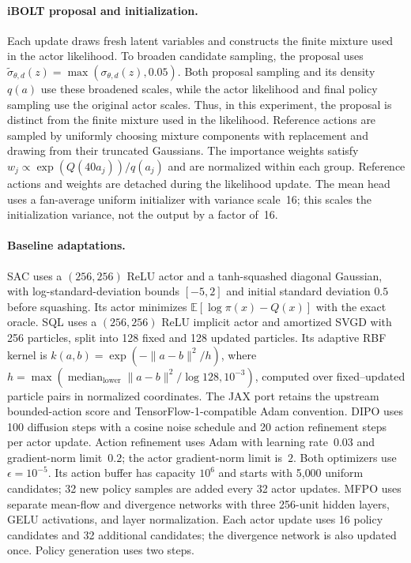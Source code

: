 \paragraph{iBOLT proposal and initialization.}
Each update draws fresh latent variables and constructs the finite mixture
used in the actor likelihood. To broaden candidate sampling, the proposal
uses $\widetilde{\sigma}_{\theta,d}(z)=\max(\sigma_{\theta,d}(z),0.05)$.
Both proposal sampling and its density $q(a)$ use these broadened scales,
while the actor likelihood and final policy sampling use the original
actor scales. Thus, in this experiment, the proposal is distinct from the
finite mixture used in the likelihood. Reference actions are sampled by
uniformly choosing mixture components with replacement and drawing from
their truncated Gaussians. The importance weights satisfy
$w_j\propto\exp(Q(40a_j))/q(a_j)$ and are normalized within each group.
Reference actions and weights are detached during the likelihood update.
The mean head uses a fan-average uniform initializer with variance scale~16;
this scales the initialization variance, not the output by a factor of~16.

\paragraph{Baseline adaptations.}
SAC uses a $(256,256)$ ReLU actor and a tanh-squashed diagonal Gaussian,
with log-standard-deviation bounds $[-5,2]$ and initial standard deviation
$0.5$ before squashing. Its actor minimizes
$\mathbb{E}[\log\pi(x)-Q(x)]$ with the exact oracle.
SQL uses a $(256,256)$ ReLU implicit actor and amortized SVGD with
256 particles, split into 128 fixed and 128 updated particles.
Its adaptive RBF kernel is $k(a,b)=\exp(-\|a-b\|^2/h)$, where
$h=\max(\operatorname{median}_{\mathrm{lower}}\|a-b\|^2/\log 128,10^{-3})$,
computed over fixed--updated particle pairs in normalized coordinates.
The JAX port retains the upstream bounded-action score and
TensorFlow-1-compatible Adam convention.
DIPO uses 100 diffusion steps with a cosine noise schedule and 20 action
refinement steps per actor update. Action refinement uses Adam with learning
rate~$0.03$ and gradient-norm limit~$0.2$; the actor gradient-norm limit is~$2$.
Both optimizers use $\epsilon=10^{-5}$. Its action buffer has capacity
$10^6$ and starts with 5{,}000 uniform candidates; 32 new policy samples
are added every 32 actor updates.
MFPO uses separate mean-flow and divergence networks with three
256-unit hidden layers, GELU activations, and layer normalization.
Each actor update uses 16 policy candidates and 32 additional candidates;
the divergence network is also updated once. Policy generation uses two steps.


